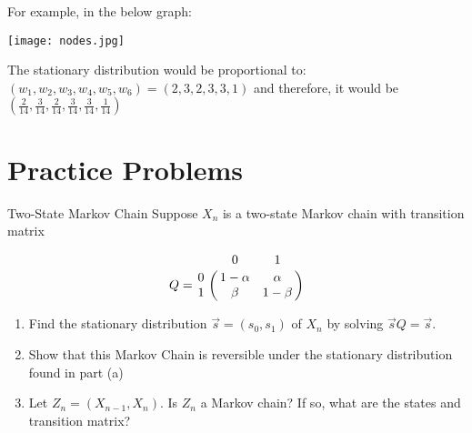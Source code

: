 \documentclass[11.5pt]{article}
\begin{document}
\begin{notes}
For example, in the below graph:
\begin{center}
\texttt{[image: nodes.jpg]}
\end{center}

The stationary distribution would be proportional to: 
$(w_1, w_2, w_3, w_4, w_5, w_6) = (2, 3, 2, 3, 3, 1)$ and therefore, it would be $\left(\frac{2}{14},\frac{3}{14},\frac{2}{14},\frac{3}{14},\frac{3}{14},\frac{1}{14} \right)$

\end{notes}

\section*{Practice Problems} 

\begin{exercise}{Two-State Markov Chain}
Suppose $X_n$ is a two-state Markov chain with transition matrix

\[
Q = \bordermatrix{~ & 0 & 1 \cr
                  0 & 1-\alpha & \alpha \cr
                  1 & \beta & 1-\beta \cr}
\]
\begin{enumerate}
	\item Find the stationary distribution $\vec{s} = (s_0, s_1)$ of $X_n$ by solving $\vec{s} Q = \vec{s}$. 
	\item Show that this Markov Chain is reversible under the stationary distribution found in part (a)
	\item Let $Z_n = (X_{n-1}, X_n)$. Is $Z_n$ a Markov chain? If so, what are the states and transition matrix?
\end{enumerate}
\end{exercise}
\end{document}
